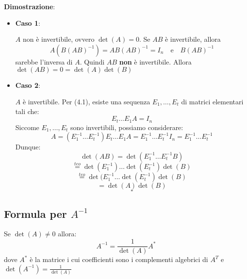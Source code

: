 \documentclass[a4paper]{article}
\theoremstyle{break}
\theoremstyle{break}
\theoremstyle{break}
\theoremstyle{break}
\begin{document}
\vspace{1em}
\noindent \textbf{Dimostrazione}:
\begin{itemize}
  \item \textbf{Caso 1}:

    \( A \) non è invertibile, ovvero \( \det(A) = 0 \). Se \( AB \) è invertibile, allora
    \[
      A(B(AB)^{-1}) = AB(AB)^{-1} = I_n \quad \text{e} \quad B(AB)^{-1}
    \] 
    sarebbe l'inversa di \( A \). Quindi \( AB \) \textbf{non} è invertibile.
    Allora \( \det(AB) = 0 = \det(A) \det(B) \) 

  \item \textbf{Caso 2}:

    \( A \) è invertibile. Per (4.1), esiste una sequenza \( E_1, \ldots, E_t \) di
    matrici elementari tali che:
    \[
    E_t \ldots E_1 A = I_n
    \] 
    Siccome \( E_1, \ldots, E_t \) sono invertibili, possiamo considerare:
    \[
    A = (E_1^{-1} \ldots E_t^{-1})E_t \ldots E_1 A = E_1^{-1} \ldots E_t^{-1}
    I_n = E_1^{-1} \ldots E_t^{-1}
    \] 
    Dunque:
    \[
    \det(AB) = \det(E_1^{-1} \ldots E_t^{-1}B)
    \] 
    \[
      \stackrel{teo}{=} \det(E_1^{-1}) \ldots \det(E_t^{-1}) \det(B)
    \] 
    \[
      \stackrel{teo}{=} \det(E_1^{-1} \ldots \det(E_t^{-1}) \det(B)
    \] 
    \[
    = \det(A) \det(B)
    \] 
    \[
    \square
    \] 
\end{itemize}

\subsection{Formula per \texorpdfstring{\( A^{-1} \)}{A inversa}}
\label{4.14}
Se \( \det(A) \neq 0 \) allora:
\[
  A^{-1} = \frac{1}{\det(A)} A^*
\] 
dove \( A^* \) è la matrice i cui coefficienti sono i complementi algebrici di \( A^T \)
e \( \det(A^{-1}) = \frac{1}{\det(A)} \) 
\end{document}
